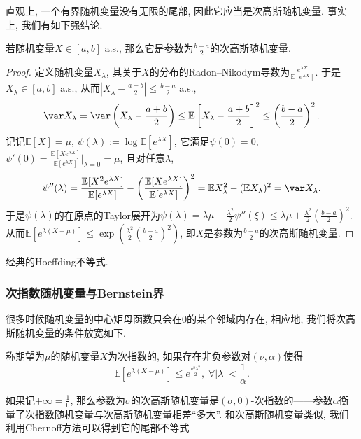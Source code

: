 直观上, 一个有界随机变量没有无限的尾部, 因此它应当是次高斯随机变量. 
事实上, 我们有如下强结论. 
\begin{lemma}[有界随机变量的次高斯参数]\label{lemma:SubGaussianParameterOfBddRV}
	若随机变量$X \in [a, b]$ a.s., 那么它是参数为$\frac{b-a}{2}$的次高斯随机变量. 
\end{lemma}
\begin{proof}
	定义随机变量$X_{\lambda}$, 其关于$X$的分布的Radon–Nikodym导数为$\frac{e^{\lambda X}}{\mathbb{E}[e^{\lambda X}]}$. 
	于是$X_{\lambda} \in [a, b]$ a.s., 从而$\left|X_{\lambda} - \frac{a+b}{2} \right| \leq \frac{b-a}{2}$ a.s., 
	\begin{equation*}
		\var X_{\lambda}
		= \var \left(X_{\lambda} - \frac{a+b}{2} \right) 
		\leq \mathbb{E}\left[X_{\lambda} - \frac{a+b}{2} \right]^2 
		\leq \left(\frac{b-a}{2}\right)^2. 
	\end{equation*}
	记记$\mathbb{E}[X] = \mu$, $\psi(\lambda) := \log \mathbb{E}[e^{\lambda X}]$, 它满足$\psi(0) = 0$, $\psi'(0) = \frac{\mathbb{E}[X e^{\lambda X}]}{\mathbb{E}[e^{\lambda X}]} \big|_{\lambda = 0} = \mu$, 且对任意$\lambda$,  
	\begin{equation*}
		\psi''(\lambda) 
		= \frac{\mathbb{E}[X^2 e^{\lambda X}]}{\mathbb{E}[e^{\lambda X}]} - \left( \frac{\mathbb{E}[X e^{\lambda X}]}{\mathbb{E}[e^{\lambda X}]} \right)^2
		= \mathbb{E}X_{\lambda}^2 - (\mathbb{E}X_{\lambda})^2
		= \var X_{\lambda}.  
	\end{equation*}
	于是$\psi(\lambda)$的在原点的Taylor展开为$\psi(\lambda) = \lambda \mu + \frac{\lambda^2}{2} \psi''(\xi) \leq \lambda \mu + \frac{\lambda^2}{2} \left(\frac{b-a}{2}\right)^2$. 
	从而$\mathbb{E}[e^{\lambda(X - \mu)}] \leq \exp\left(\frac{\lambda^2}{2} \left(\frac{b-a}{2}\right)^2\right)$, 即$X$是参数为$\frac{b-a}{2}$的次高斯随机变量. 
\end{proof}

\begin{corollary}
	经典的Hoeffding不等式. 
\end{corollary}


\subsubsection{次指数随机变量与Bernstein界}

很多时候随机变量的中心矩母函数只会在$0$的某个邻域内存在, 相应地, 我们将次高斯随机变量的条件放宽如下. 
\begin{definition}[次指数随机变量]
	称期望为$\mu$的随机变量$X$为次指数的, 如果存在非负参数对$(\nu, \alpha)$使得
	\begin{equation*}
		\mathbb{E}[ e^{\lambda(X - \mu)} ] 
		\leq e^{\frac{\nu^2 \lambda^2}{2}},\; 
		\forall |\lambda| < \frac{1}{\alpha}. 
	\end{equation*}
\end{definition}
\noindent
如果记$+\infty = \frac10$, 那么参数为$\sigma$的次高斯随机变量是$(\sigma, 0)$-次指数的——参数$\alpha$衡量了次指数随机变量与次高斯随机变量相差“多大”. 
和次高斯随机变量类似, 我们利用Chernoff方法可以得到它的尾部不等式


